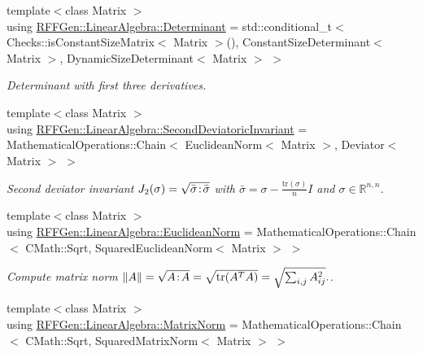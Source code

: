 \begin{DoxyCompactItemize}
\item 
\hypertarget{group__LinearAlgebraGroup_gab9d32635f75364703a95fb0d00099168}{{\footnotesize template$<$class Matrix $>$ }\\using \hyperlink{group__LinearAlgebraGroup_gab9d32635f75364703a95fb0d00099168}{R\-F\-F\-Gen\-::\-Linear\-Algebra\-::\-Determinant} = std\-::conditional\-\_\-t$<$ Checks\-::is\-Constant\-Size\-Matrix$<$ Matrix $>$(), Constant\-Size\-Determinant$<$ Matrix $>$, Dynamic\-Size\-Determinant$<$ Matrix $>$ $>$}\label{group__LinearAlgebraGroup_gab9d32635f75364703a95fb0d00099168}

\begin{DoxyCompactList}\small\item\em Determinant with first three derivatives. \end{DoxyCompactList}\item 
\hypertarget{group__LinearAlgebraGroup_gad7970e9633f69d0b8d0afd300209e63d}{{\footnotesize template$<$class Matrix $>$ }\\using \hyperlink{group__LinearAlgebraGroup_gad7970e9633f69d0b8d0afd300209e63d}{R\-F\-F\-Gen\-::\-Linear\-Algebra\-::\-Second\-Deviatoric\-Invariant} = Mathematical\-Operations\-::\-Chain$<$ Euclidean\-Norm$<$ Matrix $>$, Deviator$<$ Matrix $>$ $>$}\label{group__LinearAlgebraGroup_gad7970e9633f69d0b8d0afd300209e63d}

\begin{DoxyCompactList}\small\item\em Second deviator invariant $ J_2(\sigma)=\sqrt{\bar\sigma\negthinspace:\negthinspace\bar\sigma} $ with $\bar\sigma = \sigma - \frac{\mathrm{tr}(\sigma)}{n}I$ and $\sigma\in\mathbb{R}^{n,n}$. \end{DoxyCompactList}\item 
\hypertarget{group__LinearAlgebraGroup_gaee2184589f2dddd26f00bd695ebcd577}{{\footnotesize template$<$class Matrix $>$ }\\using \hyperlink{group__LinearAlgebraGroup_gaee2184589f2dddd26f00bd695ebcd577}{R\-F\-F\-Gen\-::\-Linear\-Algebra\-::\-Euclidean\-Norm} = Mathematical\-Operations\-::\-Chain$<$ C\-Math\-::\-Sqrt, Squared\-Euclidean\-Norm$<$ Matrix $>$ $>$}\label{group__LinearAlgebraGroup_gaee2184589f2dddd26f00bd695ebcd577}

\begin{DoxyCompactList}\small\item\em Compute matrix norm $ \|A\| = \sqrt{A\negthinspace : \negthinspace A }= \sqrt{\mathrm{tr}(A^TA)} = \sqrt{\sum_{i,j} A_{ij}^2}. $. \end{DoxyCompactList}\item 
\hypertarget{group__LinearAlgebraGroup_gaa59381731a80fe009e56f86f78ebc703}{{\footnotesize template$<$class Matrix $>$ }\\using \hyperlink{group__LinearAlgebraGroup_gaa59381731a80fe009e56f86f78ebc703}{R\-F\-F\-Gen\-::\-Linear\-Algebra\-::\-Matrix\-Norm} = Mathematical\-Operations\-::\-Chain$<$ C\-Math\-::\-Sqrt, Squared\-Matrix\-Norm$<$ Matrix $>$ $>$}\label{group__LinearAlgebraGroup_gaa59381731a80fe009e56f86f78ebc703}


\end{DoxyCompactItemize}

